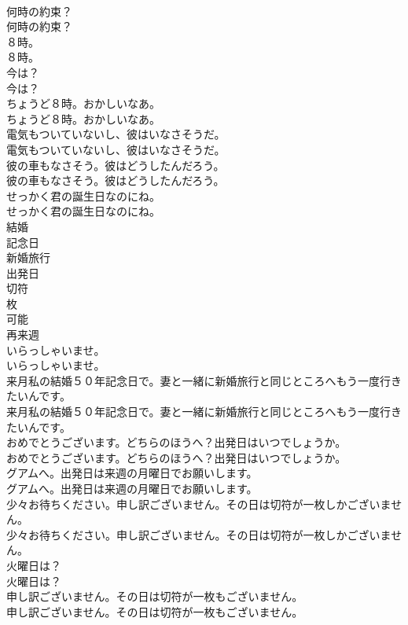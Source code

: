 \documentclass[8pt]{extreport}
\begin{document}
\begin{CJK}{UTF8}{min}
\\	何時の約束？	
\\	何時の約束？ 
\\	８時。	
\\	８時。 
\\	今は？	
\\	今は？ 
\\	ちょうど８時。おかしいなあ。	
\\	ちょうど８時。おかしいなあ。 
\\	電気もついていないし、彼はいなさそうだ。	
\\	電気もついていないし、彼はいなさそうだ。 
\\	彼の車もなさそう。彼はどうしたんだろう。	
\\	彼の車もなさそう。彼はどうしたんだろう。 
\\	せっかく君の誕生日なのにね。	
\\	せっかく君の誕生日なのにね。 
\\	結婚
\\	記念日
\\	新婚旅行
\\	出発日
\\	切符
\\	枚
\\	可能
\\	再来週
\\	いらっしゃいませ。	
\\	いらっしゃいませ。 
\\	来月私の結婚５０年記念日で。妻と一緒に新婚旅行と同じところへもう一度行きたいんです。	
\\	来月私の結婚５０年記念日で。妻と一緒に新婚旅行と同じところへもう一度行きたいんです。 
\\	おめでとうございます。どちらのほうへ？出発日はいつでしょうか。	
\\	おめでとうございます。どちらのほうへ？出発日はいつでしょうか。 
\\	グアムへ。出発日は来週の月曜日でお願いします。	
\\	グアムへ。出発日は来週の月曜日でお願いします。 
\\	少々お待ちください。申し訳ございません。その日は切符が一枚しかございません。	
\\	少々お待ちください。申し訳ございません。その日は切符が一枚しかございません。 
\\	火曜日は？	
\\	火曜日は？ 
\\	申し訳ございません。その日は切符が一枚もございません。	
\\	申し訳ございません。その日は切符が一枚もございません。 

\end{CJK}
\end{document}
